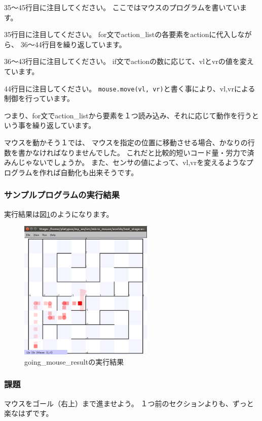 \documentclass[11pt,a4paper]{jsarticle}
\begin{document}
35〜45行目に注目してください。
ここではマウスのプログラムを書いています。

35行目に注目してください。
for文でaction\_listの各要素をactionに代入しながら、
36〜44行目を繰り返しています。

36〜43行目に注目してください。
if文でactionの数に応じて、vlとvrの値を変えています。

44行目に注目してください。
\verb|mouse.move(vl, vr)|と書く事により、vl,vrによる制御を行っています。

つまり、for文でaction\_listから要素を１つ読み込み、それに応じて動作を行うという事を繰り返しています。

マウスを動かそう１では、
マウスを指定の位置に移動させる場合、かなりの行数を書かなければなりませんでした。
これだと比較的短いコード量・労力で済みんじゃないでしょうか。
また、センサの値によって、vl,vrを変えるようなプログラムを作れば自動化も出来そうです。



\subsubsection{サンプルプログラムの実行結果}
実行結果は図\ref{going_mouse_result}のようになります。
\begin{figure}[h]
  \begin{center}
    \includegraphics[width=64mm]{./going_mouse_result.png}
  \end{center}
  \label{going_mouse_result}
  \caption{going\_mouse\_resultの実行結果}
\end{figure}

\subsubsection{課題}
マウスをゴール（右上）まで進ませよう。
１つ前のセクションよりも、ずっと楽なはずです。
\end{document}
